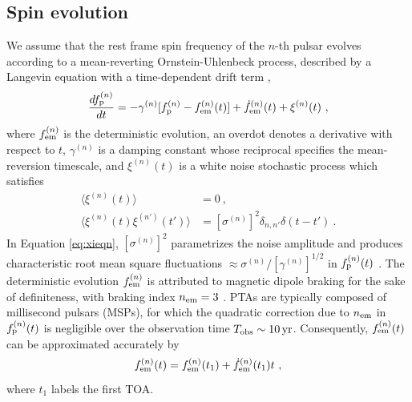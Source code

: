 \documentclass[fleqn,usenatbib,useAMS]{mnras}
\begin{document}
\subsection{Spin evolution} \label{sec:psr_frequency}
We assume that the rest frame spin frequency of the $n$-th pulsar evolves according to a mean-reverting Ornstein-Uhlenbeck process, described by a Langevin equation with a time-dependent drift term \citep{Vargas},
\begin{equation}
	\frac{df_{\rm p}^{(n)}}{dt} = -\gamma^{(n)}	 [f_{\rm p}^{(n)} - f_{\rm em}^{(n)} (t)] + \dot{f}_{\rm em}^{(n)}(t) +\xi^{(n)}(t) \ , 
	\label{eq:frequency_evolution}
\end{equation}
where $f_{\rm em}^{(n)}$ is the deterministic evolution, an overdot denotes a derivative with respect to $t$, $\gamma^{(n)}$ is a damping constant whose reciprocal specifies the mean-reversion timescale, and $\xi^{(n)}(t)$ is a white noise stochastic process which satisfies
\begin{align}
	\langle \xi^{(n)}(t) \rangle &= 0 \ , \\
	\langle \xi^{(n)}(t) \xi^{(n')}(t') \rangle &= [\sigma^{(n)}]^2 \delta_{n,n'} \delta(t - t') \ .	\label{eq:xieqn}
\end{align}
In Equation \eqref{eq:xieqn}, $[\sigma^{(n)}]^2$ parametrizes the noise amplitude and produces characteristic root mean square fluctuations $\approx \sigma^{(n)} / [\gamma^{(n)}]^{1/2}$ in $f_{\rm p}^{(n)}(t)$ \citep{gardiner2009stochastic}. The deterministic evolution $f_{\rm em}^{(n)}$ is attributed to magnetic dipole braking for the sake of definiteness, with braking index $n_{\rm em}=3$ \citep{1969ApJ...157..869G}. PTAs are typically composed of millisecond pulsars (MSPs), for which the quadratic correction due to $n_{\rm em}$ in $f_{\rm p}^{(n)}(t)$ is negligible over the observation time $T_{\rm obs} \sim 10 \, {\rm yr}$. Consequently, 	$f_{\rm em}^{(n)}(t)$ can be approximated accurately by 
\begin{equation}
	f_{\rm em}^{(n)}(t) = f_{\rm em}^{(n)}(t_1) + \dot{f}_{\rm em}^{(n)}(t_1)t \ , \label{eq:spinevol}
\end{equation} 
where $t_1$ labels the first TOA. \newline 
\end{document}
